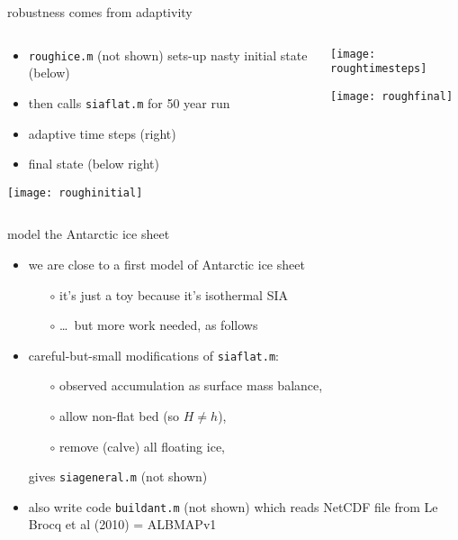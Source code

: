 \begin{frame}{robustness comes from adaptivity}

\begin{columns}
\begin{column}{0.5\textwidth}
\begin{itemize}
\item \texttt{roughice.m} (not shown) sets-up nasty initial state (below)
\item then calls \texttt{siaflat.m} for 50 year run
\item adaptive time steps (right)
\item final state (below right)
\end{itemize}

\vspace{3mm}
\texttt{[image: roughinitial]}
\end{column}
\begin{column}{0.5\textwidth}
\texttt{[image: roughtimesteps]}

\vspace{5mm}
\texttt{[image: roughfinal]}
\end{column}
\end{columns}
\end{frame}


\begin{frame}{model the Antarctic ice sheet}

\begin{itemize}
\item we are close to a first model of Antarctic ice sheet
  \begin{itemize}
  \item[$\circ$] it's just a toy because it's isothermal SIA
  \item[$\circ$] \dots\, but more work needed, as follows
  \end{itemize}

\bigskip
\item careful-but-small modifications of \texttt{siaflat.m}:
  \begin{itemize}
  \item[$\circ$] observed accumulation as surface mass balance,
  \item[$\circ$] allow non-flat bed (so $H\ne h$),
  \item[$\circ$] remove (calve) all floating ice,
  \end{itemize}
gives \texttt{siageneral.m} (not shown)

\bigskip
\item also write code \texttt{buildant.m} (not shown) which reads NetCDF file from Le Brocq et al (2010) = ALBMAPv1
\end{itemize}
\end{frame}


